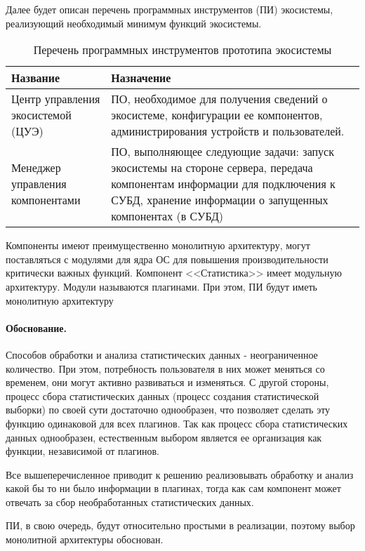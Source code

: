 Далее будет описан перечень программных инструментов (ПИ) экосистемы, реализующий необходимый минимум функций экосистемы.
\begin{table}[ht]
   \captionsetup{justification=raggedright,labelfont=md,textfont=md}

   \caption{Перечень программных инструментов прототипа экосистемы}
   \label{table-systools}
   \centering
   \begin{tabularx}{\textwidth}{|>{\centering}p{}|X|}
      \cline{1-2}
      Название & Назначение \\
      \hline
      Центр управления экосистемой (ЦУЭ) & ПО, необходимое для получения сведений о экосистеме, конфигурации ее компонентов, администрирования устройств и пользователей. \\
      \hline
      Менеджер управления компонентами & ПО, выполняющее следующие задачи:
      запуск экосистемы на стороне сервера, 
      передача компонентам информации для подключения к СУБД, 
      хранение информации о запущенных компонентах (в СУБД) \\
      \hline
   \end{tabularx}
\end{table}

Компоненты имеют преимущественно монолитную архитектуру, могут поставляться с модулями для ядра ОС для повышения производительности критически важных функций.
Компонент <<Статистика>> имеет модульную архитектуру. Модули называются плагинами. При этом, ПИ будут иметь монолитную архитектуру

\paragraph{Обоснование.} 
Способов обработки и анализа статистических данных - неограниченное количество. При этом, потребность пользователя в них может меняться со временем, они могут активно развиваться и изменяться.
С другой стороны, процесс сбора статистических данных (процесс создания статистической выборки) по своей сути достаточно однообразен, что позволяет сделать эту функцию одинаковой для всех плагинов. Так как процесс сбора статистических данных однообразен, естественным выбором является ее организация как функции, независимой от плагинов.

Все вышеперечисленное приводит к решению реализовывать обработку и анализ какой бы то ни было информации в плагинах, тогда как сам компонент может отвечать за сбор необработанных статистических данных.  

ПИ, в свою очередь, будут относительно простыми в реализации, поэтому выбор монолитной архитектуры обоснован.
